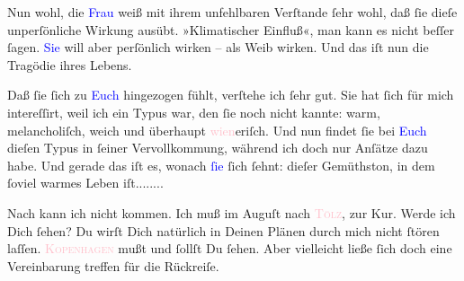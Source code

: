 \pstart
           Nun wohl, die \textcolor{blue}{Frau}{}\ledrightnote{{$\rightarrow$}\textcolor{blue}{Lou Andreas-Salomé}} weiß mit
               ihrem unfehlbaren Verſtande ſehr wohl, daß ſie dieſe unperſönliche Wirkung ausübt.
               »Klimatischer {\pb}Einfluß«, man kann es nicht beſſer
               ſagen. \textcolor{blue}{Sie}{}\ledrightnote{{$\rightarrow$}\textcolor{blue}{Lou Andreas-Salomé}} will aber
               perſönlich wirken – als Weib wirken. Und das iſt nun die Tragödie ihres Lebens.\pend
           
\pstart
           Daß ſie ſich zu \textcolor{blue}{Euch}{}\ledrightnote{{$\rightarrow$}\textcolor{blue}{Richard Beer-Hofmann}}
               hingezogen fühlt, verſtehe ich ſehr gut. Sie hat ſich für mich intereſſirt, weil ich
               ein Typus war, den ſie noch nicht kannte: warm, melancholiſch, weich und \strikeout{\textcolor{pink}{wien
                  }{}\ledrightnote{\textcolor{pink}{Wien}}\textcolor{gray}{e}} überhaupt \textcolor{pink}{wien}{}\ledrightnote{\textcolor{pink}{Wien}}eriſch. Und nun findet ſie
               bei \textcolor{blue}{Euch}{}\ledrightnote{{$\rightarrow$}\textcolor{blue}{Richard Beer-Hofmann}} dieſen {\pb} Typus in ſeiner Vervollkommung, während ich doch
               nur Anſätze dazu habe. Und gerade das iſt es, wonach \textcolor{blue}{ſie}{}\ledrightnote{{$\rightarrow$}\textcolor{blue}{Lou Andreas-Salomé}} ſich ſehnt: dieſer Gemüthston, in dem
               ſoviel warmes Leben iſt........\pend
           
\pstart
           Nach \label{K_L02735-3v}\label{K_L02735-3h} kann ich nicht kommen.
               Ich muß im Auguſt nach \textsc{\textcolor{pink}{Tölz}{}\ledrightnote{\textcolor{pink}{Bad Tölz}}}, zur Kur. Werde ich Dich ſehen? Du wirſt {\pb}Dich
               natürlich in Deinen Plänen durch mich nicht ſtören laſſen. \strikeout{\textcolor{gray}{×}\-\textcolor{gray}{×}\-\textcolor{gray}{×}\-\textcolor{gray}{×}}{ }\textsc{\textcolor{pink}{Kopenhagen}{}\ledrightnote{\textcolor{pink}{Kopenhagen}}} mußt und ſollſt Du ſehen. Aber vielleicht ließe ſich doch eine Vereinbarung
               treffen für die Rückreiſe.\pend
           
